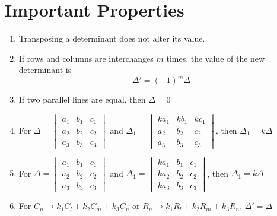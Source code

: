 \section{Important Properties}
\begin{enumerate}
	\item Transposing a determinant does not alter its value.
	\item If rows and columns are interchanges $m$ times, the value of the new determinant is
	\begin{equation}
		\Delta'=(-1)^m \Delta
	\end{equation}
	\item If two parallel lines are equal, then $\Delta=0$
	\item For $\Delta=\begin{vmatrix}a_1&b_1&c_1\\a_2&b_2&c_2\\a_3&b_3&c_3\end{vmatrix}$ and $\Delta_1=\begin{vmatrix}ka_1&kb_1&kc_1\\a_2&b_2&c_2\\a_3&b_3&c_3\end{vmatrix}$, then $\Delta_1=k\Delta$
	\item For $\Delta=\begin{vmatrix}a_1&b_1&c_1\\a_2&b_2&c_2\\a_3&b_3&c_3\end{vmatrix}$ and $\Delta_1=\begin{vmatrix}ka_1&b_1&c_1\\ka_2&b_2&c_2\\ka_3&b_3&c_3\end{vmatrix}$, then $\Delta_1=k\Delta$
	\item For $C_n\rightarrow k_1C_l+k_2C_m+k_3C_n$ or $R_n\rightarrow k_1R_l+k_2R_m+k_3R_n$, $\Delta'=\Delta$
\end{enumerate}

